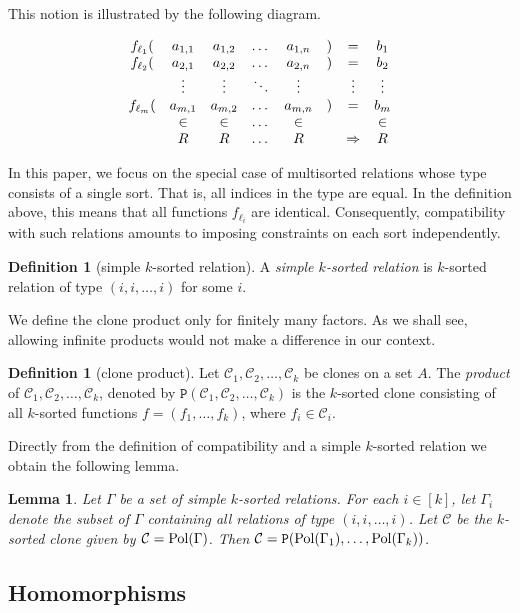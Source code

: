 \documentclass{amsart}
\numberwithin{equation}{section}
\theoremstyle{plain}
\newtheorem{lemma}[theorem]{Lemma}
\theoremstyle{definition}
\newtheorem{definition}[theorem]{Definition}
\def\set#1{#1}
\def\clone#1{\mathcal{#1}}
\def\C#1{{\mathtt{P}}(#1)}
\def\Pol{{\rm Pol}}
\begin{document}
This notion is illustrated by the following diagram.

$$\begin{matrix}
f_{\ell_1}(& a_{1,1} & a_{1,2} & \dots & a_{1,n} & ) & = & b_1 \cr
f_{\ell_2}(& a_{2,1} & a_{2,2} & \dots & a_{2,n} & ) & = & b_2 \cr
& \vdots & \vdots & \ddots & \vdots &  & \vdots & \vdots \cr
f_{\ell_m}(& a_{m,1} & a_{m,2} & \dots & a_{m,n} & ) & = & b_m \cr
& \in & \in & \dots & \in &  &  & \in \cr
& R & R & \dots & R &  & \Rightarrow & R \cr
\end{matrix}$$

In this paper, we focus on the special case of multisorted relations whose type consists of a single sort. That is, all indices in the type are equal. In the definition above, this means that all functions $f_{\ell_i}$ are identical. Consequently, compatibility with such relations amounts to imposing constraints on each sort independently.

\begin{definition}[simple $k$-sorted relation]
A {\em simple $k$-sorted relation} is $k$-sorted relation of type $(i,i,\dots,i)$ for some $i$.
\end{definition}

We define the clone product only for finitely many factors. As we shall see, allowing infinite products would not make a difference in our context.

\begin{definition}[clone product]
Let $\clone{C}_1,\clone{C}_2,\dots,\clone{C}_k$ be clones on a set $\set{A}$. The {\em product} of $\clone{C}_1,\clone{C}_2,\dots,\clone{C}_k$, denoted by $\C{\clone{C}_1,\clone{C}_2,\dots,\clone{C}_k}$ is the $k$-sorted clone consisting of all $k$-sorted functions $f = (f_1,\dots,f_k)$, where $f_i\in \clone{C}_i$.
\end{definition}

Directly from the definition of compatibility and a simple $k$-sorted relation we obtain the following lemma. 

\begin{lemma}
  \label{all-clones-are-products}
  Let $\Gamma$ be a set of simple $k$-sorted relations. For each $i\in[k]$, let $\Gamma_i$ denote the subset of $\Gamma$ containing all relations of type $(i,i,\dots,i)$. Let $\clone{C}$ be the $k$-sorted clone given by $\clone{C}=\Pol(\Gamma)$. Then $\clone{C}=\C{\Pol({\Gamma}_1),\dots,\Pol({\Gamma}_k)}$.
\end{lemma}

\subsection{Homomorphisms}
\end{document}
